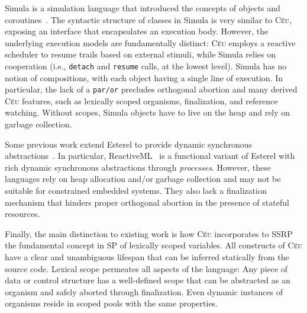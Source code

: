 \documentclass[preprint]{sigplanconf}
\newcommand{\CEU}{\textsc{C\'{e}u}\xspace}
\newcommand{\code}[1] {{\small{\texttt{#1}}}}
\newcommand{\1}{\;}
\newcommand{\2}{\;\;}
\newcommand{\3}{\;\;\;}
\newcommand{\5}{\;\;\;\;\;}
\begin{document}
Simula is a simulation language that introduced the concepts of objects and 
coroutines~\cite{simula}.
%
The syntactic structure of classes in Simula is very similar to \CEU, exposing 
an interface that encapsulates an execution body.
%
However, the underlying execution models are fundamentally distinct:
\CEU employs a reactive scheduler to resume trails based on external stimuli, 
while Simula relies on cooperation (i.e., \code{detach} and \code{resume} 
calls, at the lowest level).
%
Simula has no notion of compositions, with each object having a single line of 
execution.
In particular, the lack of a \code{par/or} precludes orthogonal abortion and 
many derived \CEU features, such as lexically scoped organisms, finalization, 
and reference watching.
%
Without scopes, Simula objects have to live on the heap and rely on garbage 
collection.
%

Some previous work extend Esterel to provide dynamic synchronous 
abstractions~\cite{rp.scripts,rp.oo,sugarcubes}.
%
In particular, ReactiveML~\cite{rml} is a functional variant of Esterel with 
rich dynamic synchronous abstractions through \emph{processes}.
%
However, these languages rely on heap allocation and/or garbage collection and 
may not be suitable for constrained embedded systems.
%
%
They also lack a finalization mechanism that hinders proper orthogonal abortion 
in the presence of stateful resources.

Finally, the main distinction to existing work is how \CEU incorporates to SSRP 
the fundamental concept in SP of lexically scoped variables.
%
All constructs of \CEU have a clear and unambiguous lifespan that can be 
inferred statically from the source code.
%
Lexical scope permeates all aspects of the language:
Any piece of data or control structure has a well-defined scope that can be 
abstracted as an organism and safely aborted through finalization.
%
Even dynamic instances of organisms reside in scoped pools with the same 
properties.
%
\end{document}
